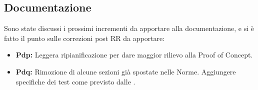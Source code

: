 \documentclass[a4paper, oneside, openany, dvipsnames, table]{article}
\begin{document}
\subsection{Documentazione}
Sono state discussi i prossimi incrementi da apportare alla documentazione, e si è fatto il punto sulle correzioni post RR da apportare:
\begin{itemize}
	\item \textbf{Pdp: }Leggera ripianificazione per dare maggior rilievo alla Proof of Concept.
	\item \textbf{Pdq: }Rimozione di alcune sezioni già spostate nelle Norme. Aggiungere specifiche dei test come previsto dalle \NdP .
\end{itemize}
\end{document}
